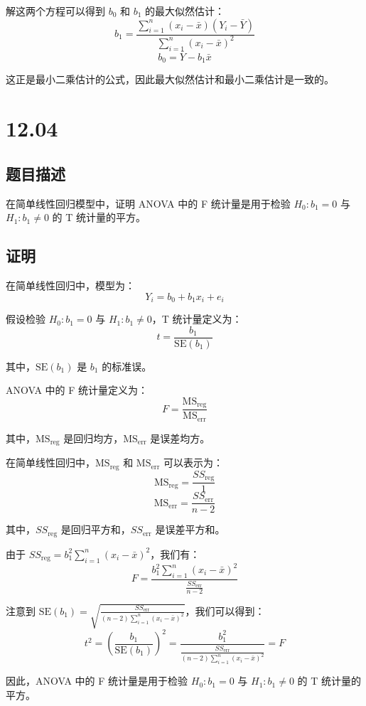 \documentclass[UTF8]{article}
\theoremstyle{MyLineTheoremStyle} %
\theoremstyle{MyBlockTheoremStyle} %
\theoremstyle{MySubsubsectionStyle} %
\begin{document}
解这两个方程可以得到 $b_0$ 和 $b_1$ 的最大似然估计：
\[
b_1 = \frac{\sum_{i=1}^n (x_i - \bar{x})(Y_i - \bar{Y})}{\sum_{i=1}^n (x_i - \bar{x})^2}
\]
\[
b_0 = \bar{Y} - b_1 \bar{x}
\]

这正是最小二乘估计的公式，因此最大似然估计和最小二乘估计是一致的。






\cleardoublepage

\section{12.04}

\subsection*{题目描述}

在简单线性回归模型中，证明 ANOVA 中的 F 统计量是用于检验 $H_0: b_1 = 0$ 与 $H_1: b_1 \neq 0$ 的 T 统计量的平方。

\subsection*{证明}

在简单线性回归中，模型为：
\[
Y_i = b_0 + b_1 x_i + e_i
\]

假设检验 $H_0: b_1 = 0$ 与 $H_1: b_1 \neq 0$，T 统计量定义为：
\[
t = \frac{b_1}{\text{SE}(b_1)}
\]

其中，$\text{SE}(b_1)$ 是 $b_1$ 的标准误。

ANOVA 中的 F 统计量定义为：
\[
F = \frac{\text{MS}_{\text{reg}}}{\text{MS}_{\text{err}}}
\]

其中，$\text{MS}_{\text{reg}}$ 是回归均方，$\text{MS}_{\text{err}}$ 是误差均方。

在简单线性回归中，$\text{MS}_{\text{reg}}$ 和 $\text{MS}_{\text{err}}$ 可以表示为：
\[
\text{MS}_{\text{reg}} = \frac{SS_{\text{reg}}}{1}
\]
\[
\text{MS}_{\text{err}} = \frac{SS_{\text{err}}}{n-2}
\]

其中，$SS_{\text{reg}}$ 是回归平方和，$SS_{\text{err}}$ 是误差平方和。

由于 $SS_{\text{reg}} = b_1^2 \sum_{i=1}^n (x_i - \bar{x})^2$，我们有：
\[
F = \frac{b_1^2 \sum_{i=1}^n (x_i - \bar{x})^2}{\frac{SS_{\text{err}}}{n-2}}
\]

注意到 $\text{SE}(b_1) = \sqrt{\frac{SS_{\text{err}}}{(n-2) \sum_{i=1}^n (x_i - \bar{x})^2}}$，我们可以得到：
\[
t^2 = \left(\frac{b_1}{\text{SE}(b_1)}\right)^2 = \frac{b_1^2}{\frac{SS_{\text{err}}}{(n-2) \sum_{i=1}^n (x_i - \bar{x})^2}} = F
\]

因此，ANOVA 中的 F 统计量是用于检验 $H_0: b_1 = 0$ 与 $H_1: b_1 \neq 0$ 的 T 统计量的平方。
\end{document}
